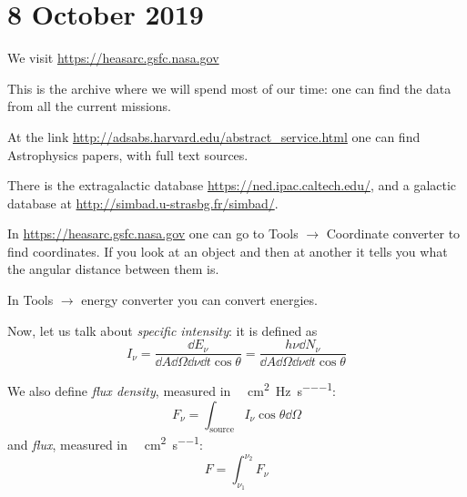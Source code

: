 \documentclass[main.tex]{subfiles}
\begin{document}
\section*{8 October 2019}

We visit \url{https://heasarc.gsfc.nasa.gov}

This is the archive where we will spend most of our time: one can find the data from all the current missions.

At the link \url{http://adsabs.harvard.edu/abstract_service.html} one can find Astrophysics papers, with full text sources.

There is the extragalactic database \url{https://ned.ipac.caltech.edu/}, and a galactic database at \url{http://simbad.u-strasbg.fr/simbad/}.

In \url{https://heasarc.gsfc.nasa.gov} one can go to Tools \(\rightarrow\) Coordinate converter to find coordinates.
If you look at an object and then at another it tells you what the angular distance between them is.

In Tools \(\rightarrow\) energy converter you can convert energies.

Now, let us talk about \emph{specific intensity}:
it is defined as
%
\begin{equation}
  I_\nu = \frac{\dd{E_\nu}}{\dd{A} \dd{\Omega} \dd{\nu} \dd{t} \cos \theta}
  = \frac{h\nu\dd{N_\nu}}{\dd{A} \dd{\Omega} \dd{\nu} \dd{t} \cos \theta}
\end{equation}

We also define \emph{flux density}, measured in \SI{}{\erg\per\square\centi\meter\per\hertz\per\second}:
%
\begin{equation}
  F_\nu = \int_{\text{source}} I_\nu \cos \theta \dd{\Omega}
\end{equation}
%
and \emph{flux}, measured in \SI{}{\erg\per\square\centi\meter\per\second}:
%
\begin{equation}
  F = \int_{\nu_1}^{\nu_2} F_\nu
\end{equation}
\end{document}
